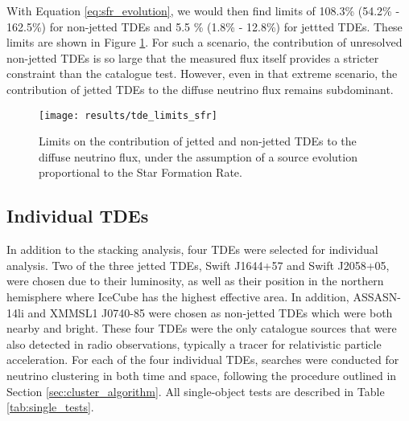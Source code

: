 With Equation \ref{eq:sfr_evolution}, we would then find limits of 108.3\% (54.2\% - 162.5\%) for non-jetted TDEs and 5.5 \% (1.8\% - 12.8\%) for jettted TDEs. These limits are shown in Figure \ref{fig:DiffuseFluxSFR}. For such a scenario, the contribution of unresolved non-jetted TDEs is so large that the measured flux itself provides a stricter constraint than the catalogue test. However, even in that extreme scenario, the contribution of jetted TDEs to the diffuse neutrino flux remains subdominant.

\begin{figure}[!ht]
	\centering \texttt{[image: results/tde\_limits\_sfr]}
	\caption{Limits on the contribution of jetted and non-jetted TDEs to the diffuse neutrino flux, under the assumption of a source evolution proportional to the Star Formation Rate.}
	\label{fig:DiffuseFluxSFR}
\end{figure}

\subsection{Individual TDEs}

In addition to the stacking analysis, four TDEs were selected for individual analysis. Two of the three jetted TDEs, Swift J1644+57 and Swift J2058+05, were chosen due to their luminosity, as well as their position in the northern hemisphere where IceCube has the highest effective area. In addition, ASSASN-14li and  XMMSL1 J0740-85 were chosen as non-jetted TDEs which were both nearby and bright. These four TDEs were the only catalogue sources that were also detected in radio observations, typically a tracer for relativistic particle acceleration. For each of the four individual TDEs, searches were conducted for neutrino clustering in both time and space, following the procedure outlined in Section \ref{sec:cluster_algorithm}. All single-object tests are described in Table \ref{tab:single_tests}.

